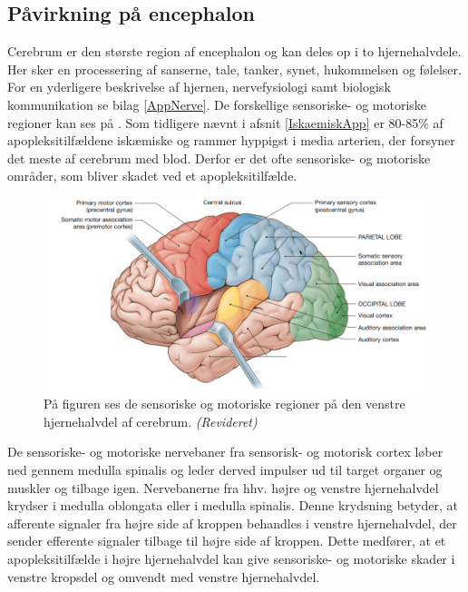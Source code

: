 \subsection{Påvirkning på encephalon}\label{HjerneSenMot}

Cerebrum er den største region af encephalon og kan deles op i to hjernehalvdele. Her sker en processering af sanserne, tale, tanker, synet, hukommelsen og følelser. \cite{Martini2012} For en yderligere beskrivelse af hjernen, nervefysiologi samt biologisk kommunikation se bilag \ref{AppNerve}. De forskellige sensoriske- og motoriske regioner kan ses på . Som tidligere nævnt i afsnit \ref{IskaemiskApp} er 80-85\% af apopleksitilfældene iskæmiske og rammer hyppigst i media arterien, der forsyner det meste af cerebrum med blod. Derfor er det ofte sensoriske- og motoriske områder, som bliver skadet ved et apopleksitilfælde. \cite{Sundhed.dk,Gade2004,Boss2010} \\

\begin{figure}[H]
	\centering
	\includegraphics[scale=0.6]{figures/bProblemanalyse/Encephalon.png}
	\caption{På figuren ses de sensoriske og motoriske regioner på den venstre hjernehalvdel af cerebrum. \textit{(Revideret)} \cite{Martini2012}}
	\label{Enc}
\end{figure}

De sensoriske- og motoriske nervebaner fra sensorisk- og motorisk cortex løber ned gennem medulla spinalis og leder derved impulser ud til target organer og muskler og tilbage igen. Nervebanerne fra hhv. højre og venstre hjernehalvdel krydser i medulla oblongata eller i medulla spinalis. Denne krydsning betyder, at afferente signaler fra højre side af kroppen behandles i venstre hjernehalvdel, der sender efferente signaler tilbage til højre side af kroppen. \cite{Martini2012,Stanfield2014} Dette medfører, at et apopleksitilfælde i højre hjernehalvdel kan give sensoriske- og motoriske skader i venstre kropsdel og omvendt med venstre hjernehalvdel. \cite{Sundhedsstyrelsen2009,Nichols1997} %

